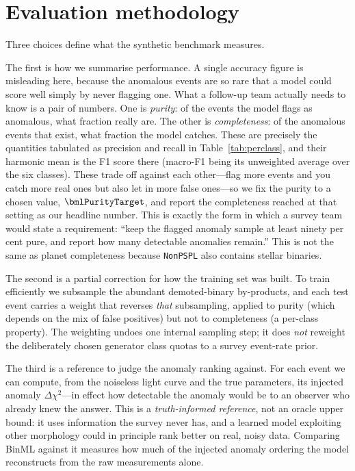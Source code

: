 \documentclass[twocolumn,linenumbers,floatfix,twocolappendix]{aastex701}
\newcommand{\dchisq}{\ensuremath{\Delta\chi^2}}
\begin{document}
\section{Evaluation methodology}\label{sec:eval}

Three choices define what the synthetic benchmark measures.

The first is how we summarise performance. A single accuracy figure is misleading here, because
the anomalous events are so rare that a model could score well simply by never flagging one. What
a follow-up team actually needs to know is a pair of numbers. One is \emph{purity}: of the events
the model flags as anomalous, what fraction really are. The other is \emph{completeness}: of the
anomalous events that exist, what fraction the model catches. These are precisely the quantities
tabulated as precision and recall in Table~\ref{tab:perclass}, and their harmonic mean is the F1
score there (macro-F1 being its unweighted average over the six classes). These trade off against each
other---flag more events and you catch more real ones but also let in more false ones---so we fix
the purity to a chosen value, $\bmlPurityTarget$, and report the completeness reached at that
setting as our headline number. This is exactly the form in which a survey team would state a
requirement: ``keep the flagged anomaly sample at least ninety per cent pure, and report how many
detectable anomalies remain.'' This is not the same as planet completeness because
\texttt{NonPSPL} also contains stellar binaries.

The second is a partial correction for how the training set was built. To train efficiently we
subsample the abundant demoted-binary by-products, and each test event carries a weight that
reverses \emph{that} subsampling, applied to purity (which depends on the mix of false positives)
but not to completeness (a per-class property). The weighting undoes one internal sampling step; it
does \emph{not} reweight the deliberately chosen generator class quotas to a survey event-rate
prior.

The third is a reference to judge the anomaly ranking against. For each event we can compute, from
the noiseless light curve and the true parameters, its injected anomaly \dchisq{}---in effect how
detectable the anomaly would be to an observer who already knew the answer. This is a
\emph{truth-informed reference}, not an oracle upper bound: it uses information the survey never
has, and a learned model exploiting other morphology could in principle rank better on real, noisy
data. Comparing BinML against it measures how much of the injected
anomaly ordering the model reconstructs from the raw measurements alone.
\end{document}
